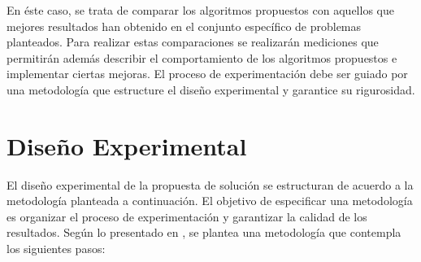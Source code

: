 En éste caso, se trata de comparar los algoritmos propuestos con aquellos que mejores resultados han obtenido en el conjunto específico de problemas planteados. Para realizar estas comparaciones se realizarán mediciones que permitirán además describir el comportamiento de los algoritmos propuestos e implementar ciertas mejoras. El proceso de experimentación debe ser guiado por una metodología que estructure el diseño experimental y garantice su rigurosidad. 
\section{Diseño Experimental}

El diseño experimental de la propuesta de solución se estructuran de acuerdo a la metodología planteada a continuación. El objetivo  de especificar una metodología es organizar el proceso de experimentación y garantizar la calidad de los resultados. Según lo presentado en \cite{BartzBeielstein2014ExperimentalAO}, se plantea una metodología que contempla los siguientes pasos:
